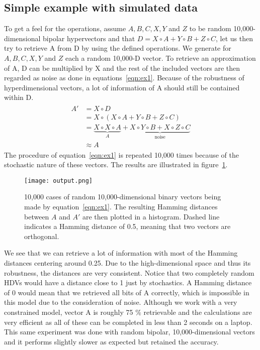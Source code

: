 \subsection*{Simple example with simulated data}
To get a feel for the operations, assume $A, B, C, X, Y$ and $Z$ to be random 10,000-dimensional bipolar hypervectors and that $D = X \circ A + Y \circ B + Z \circ C$, let us then try to retrieve A from D by using the defined operations. We generate for $A, B, C, X, Y$ and $Z$ each a random 10,000-D vector. To retrieve an approximation of A, D can be multiplied by X and the rest of the included vectors are then regarded as noise as done in equations~\ref{eqn:ex1}. Because of the robustness of hyperdimensional vectors, a lot of information of A should still be contained within D.
\begin{align}\label{eqn:ex1}
\begin{split}
    A' &= X \circ D \\
    &= X \circ (X \circ A + Y \circ B + Z \circ C) \\
    &= \underbrace{X \circ X \circ A}_A + \underbrace{X \circ Y \circ B + X \circ Z \circ C}_\text{noise} \\
    &\approx A
\end{split}
\end{align}
 The procedure of equation~\ref{eqn:ex1} is repeated 10,000 times because of the stochastic nature of these vectors. The results are illustrated in figure~\ref{fig:exm1}.
\begin{figure}[h]
    \centering
    \texttt{[image: output.png]}
    \caption{10,000 cases of random 10,000-dimensional binary vectors being made by equation~\ref{eqn:ex1}. The resulting Hamming distances between $A$ and $A'$ are then plotted in a histogram. Dashed line indicates a Hamming distance of 0.5, meaning that two vectors are orthogonal.}
    \label{fig:exm1}
\end{figure}
We see that we can retrieve a lot of information with most of the Hamming distances centering around 0.25. Due to the high-dimensional space and thus its robustness, the distances are very consistent. Notice that two completely random HDVs would have a distance close to 1 just by stochastics. A Hamming distance of 0 would mean that we retrieved all bits of A correctly, which is impossible in this model due to the consideration of noise. Although we work with a very constrained model, vector A is roughly 75 \% retrievable and the calculations are very efficient as all of these can be completed in less than 2 seconds on a laptop. This same experiment was done with random bipolar, 10,000-dimensional vectors and it performs slightly slower as expected but retained the accuracy.
